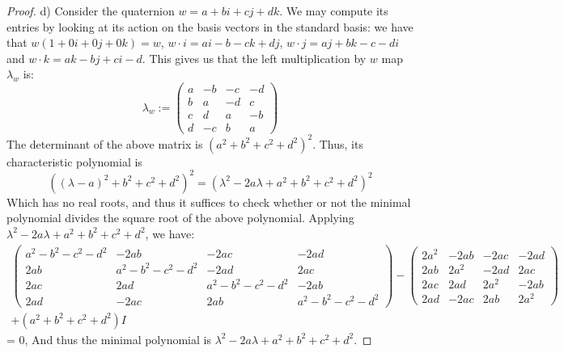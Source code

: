 \documentclass{article}
\begin{document}
\begin{proof}
  d) Consider the quaternion $w = a + bi + cj + dk$. We may compute its entries by looking at its action on the basis vectors in the standard basis: we have that $w(1 + 0i+ 0j+ 0k) = w$, $w\cdot i  = ai - b -ck + dj$, $w \cdot j = aj + bk - c -di$ and $w \cdot k = ak -bj +ci -d$. This gives us that the left multiplication by $w$ map $\lambda_{w}$ is:
  \[
    \lambda_{w} :=
    \begin{pmatrix}
      a & -b & -c & -d \\
      b & a & -d & c \\
      c & d & a & -b \\
      d & -c & b & a
    \end{pmatrix}
  \]
  The determinant of the above matrix is $(a^{2}+b^{2}+c^{2}+d^{2})^{2}$. Thus, its characteristic polynomial is \[((\lambda - a)^{2} + b^{2} + c^{2}+d^{2})^{2} = (\lambda^{2} - 2a\lambda + a^{2}+b^{2}+c^{2}+d^{2})^{2}\]
  Which has no real roots, and thus it suffices to check whether or not the minimal polynomial divides the square root of the above polynomial. Applying $\lambda^{2} - 2a\lambda + a^{2}+b^{2}+c^{2}+d^{2}$, we have:
  \begin{align*}
    \begin{pmatrix}
      a^{2}-b^{2}-c^{2}-d^{2} & -2ab & -2ac & -2ad \\
      2ab & a^{2} - b^{2} - c^{2} -d ^{2} & -2ad & 2ac \\
      2ac & 2ad & a^{2} - b^{2} - c^{2} -d^{2} & -2ab \\
      2ad & -2ac & 2ab & a^{2}-b^{2}-c^{2}-d^{2}
    \end{pmatrix}
     -     \begin{pmatrix}
      2a^{2} & -2ab & -2ac & -2ad \\
      2ab & 2a^{2} & -2ad & 2ac \\
      2ac & 2ad & 2a^{2} & -2ab \\
      2ad & -2ac & 2ab & 2a^{2}
    \end{pmatrix} \\
    + (a^{2}+b^{2}+c^{2}+d^{2})I
  \end{align*}
  = 0, 
  And thus the minimal polynomial is $\lambda^{2} - 2a\lambda + a^{2}+b^{2}+c^{2}+d^{2}$. 
\end{proof}
\end{document}
